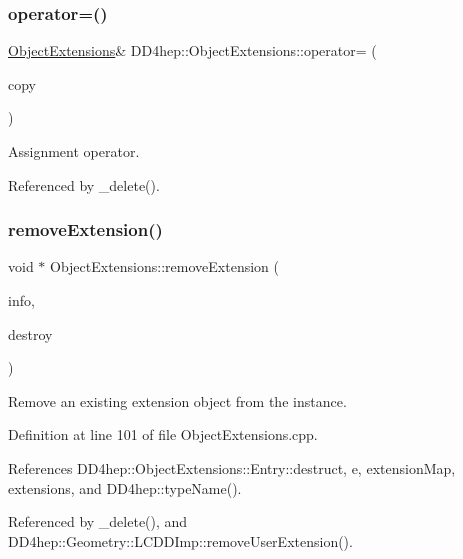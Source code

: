 \subsubsection{\texorpdfstring{operator=()}{operator=()}}
{\footnotesize\ttfamily \hyperlink{class_d_d4hep_1_1_object_extensions}{Object\+Extensions}\& D\+D4hep\+::\+Object\+Extensions\+::operator= (\begin{DoxyParamCaption}\item[{const \hyperlink{class_d_d4hep_1_1_object_extensions}{Object\+Extensions} \&}]{copy }\end{DoxyParamCaption})\hspace{0.3cm}{\ttfamily [delete]}}



Assignment operator. 



Referenced by \+\_\+delete().

\hypertarget{class_d_d4hep_1_1_object_extensions_a4ee557d0bcce3b57dd6f462a6967dd6b}{}\label{class_d_d4hep_1_1_object_extensions_a4ee557d0bcce3b57dd6f462a6967dd6b} 
\subsubsection{\texorpdfstring{remove\+Extension()}{removeExtension()}}
{\footnotesize\ttfamily void $\ast$ Object\+Extensions\+::remove\+Extension (\begin{DoxyParamCaption}\item[{const std\+::type\+\_\+info \&}]{info,  }\item[{bool}]{destroy }\end{DoxyParamCaption})}



Remove an existing extension object from the instance. 



Definition at line 101 of file Object\+Extensions.\+cpp.



References D\+D4hep\+::\+Object\+Extensions\+::\+Entry\+::destruct, e, extension\+Map, extensions, and D\+D4hep\+::type\+Name().



Referenced by \+\_\+delete(), and D\+D4hep\+::\+Geometry\+::\+L\+C\+D\+D\+Imp\+::remove\+User\+Extension().



